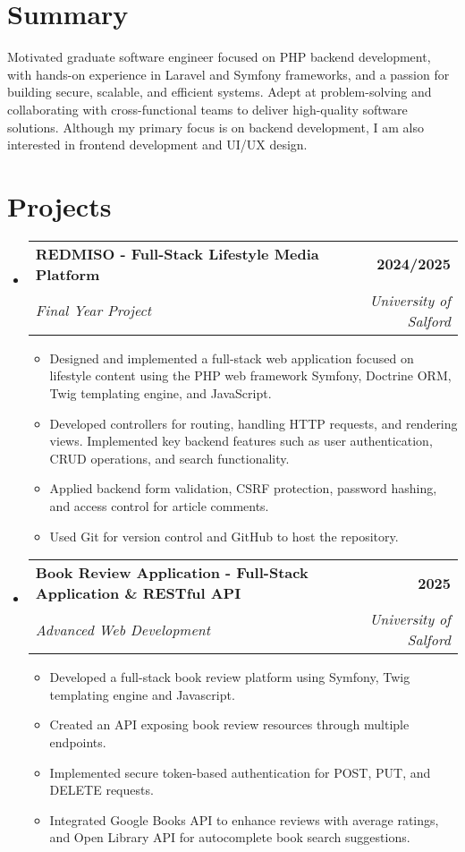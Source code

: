\documentclass[a4paper,12pt]{article}
\makeatletter
\newcommand{\resumeSubHeadingListStart}{\begin{itemize}[leftmargin=0in, label={}]}
\newcommand{\resumeSubHeadingListEnd}{\end{itemize}}
\newcommand{\resumeSubheading}[4]{
  \item
    \begin{tabular*}{\textwidth}[t]{l@{\extracolsep{\fill}}r}
      \textbf{#1} & #2 \\
      \textit{#3} & \textit{#4} \\
    \end{tabular*}\vspace{-2pt}
}
\newcommand{\resumeItem}[1]{\item #1}
\newcommand{\resumeItemListStart}{\begin{itemize}[leftmargin=2em, label=\textbullet, itemsep=2pt]}
\newcommand{\resumeItemListEnd}{\end{itemize}}
\makeatother
\begin{document}
\section{Summary}
Motivated graduate software engineer focused on PHP backend development, with hands-on experience in Laravel and Symfony frameworks, and a passion for building secure, scalable, and efficient systems. Adept at problem-solving and collaborating with cross-functional teams to deliver high-quality software solutions. Although my primary focus is on backend development, I am also interested in frontend development and UI/UX design.

\section{Projects}

\resumeSubHeadingListStart
    \resumeSubheading
    {REDMISO - Full-Stack Lifestyle Media Platform}{\bfseries{2024/2025}}
    {Final Year Project}{University of Salford}
        \resumeItemListStart
            \resumeItem{Designed and implemented a full-stack web application focused on lifestyle content using the PHP web framework Symfony, Doctrine ORM, Twig templating engine, and JavaScript.}
            \resumeItem{Developed controllers for routing, handling HTTP requests, and rendering views. Implemented key backend features such as user authentication, CRUD operations, and search functionality.}
            \resumeItem{Applied backend form validation, CSRF protection, password hashing, and access control for article comments.}
            \resumeItem{Used Git for version control and GitHub to host the repository.}
        \resumeItemListEnd
\resumeSubHeadingListEnd

\resumeSubHeadingListStart
    \resumeSubheading
    {Book Review Application - Full-Stack Application \& RESTful API}{\bfseries{2025}}
    {Advanced Web Development}{University of Salford}
        \resumeItemListStart
            \resumeItem{Developed a full-stack book review platform using Symfony, Twig templating engine and Javascript.}
            \resumeItem{Created an API exposing book review resources through multiple endpoints.}
            \resumeItem{Implemented secure token-based authentication for POST, PUT, and DELETE requests.}
            \resumeItem{Integrated Google Books API to enhance reviews with average ratings, and Open Library API for autocomplete book search suggestions.}
        \resumeItemListEnd
\resumeSubHeadingListEnd
\end{document}
